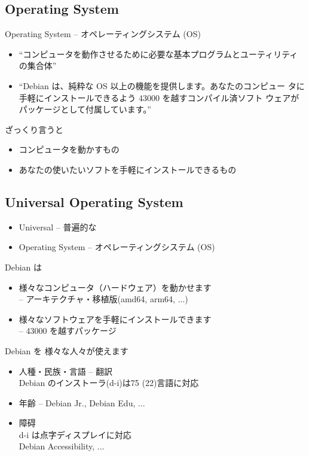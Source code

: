 \documentclass[mingoth,a4paper]{jsarticle}
\begin{document}
\subsection{Operating System}
 Operating System -- オペレーティングシステム (OS)

 \begin{itemize}
  \item “コンピュータを動作させるために必要な基本プログラムとユーティリティ
	の集合体”
  \item “Debian は、純粋な OS 以上の機能を提供します。あなたのコンピュー
	タに手軽にインストールできるよう 43000 を越すコンパイル済ソフト
	ウェアが パッケージとして付属しています。”
 \end{itemize}

 ざっくり言うと
 \begin{itemize}
  \item コンピュータを動かすもの
  \item あなたの使いたいソフトを手軽にインストールできるもの
 \end{itemize}

\subsection{Universal Operating System}
\begin{itemize}
 \item Universal -- 普遍的な
 \item Operating System -- オペレーティングシステム (OS)
\end{itemize}
 Debian は
 \begin{itemize}
  \item 様々なコンピュータ（ハードウェア）を動かせます\\
	-- アーキテクチャ・移植版(amd64, arm64, ...)
  \item 様々なソフトウェアを手軽にインストールできます\\
	-- 43000 を越すパッケージ
 \end{itemize}

 Debian を
 様々な人々が使えます
 \begin{itemize}
  \item 人種・民族・言語 -- 翻訳\\
	Debian のインストーラ(d-i)は75 (22)言語に対応
  \item 年齢 -- Debian Jr., Debian Edu, ...
  \item 障碍\\
	d-i は点字ディスプレイに対応\\
	Debian Accessibility, ...
 \end{itemize}
\end{document}
